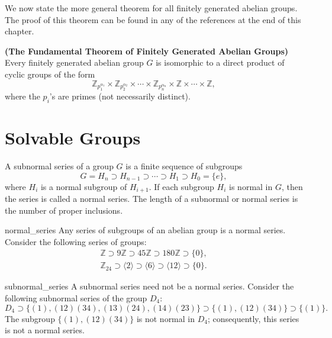  
We now state the more general theorem for all finitely generated
abelian groups.  The proof of this theorem can be found in any of the 
references at the end of this chapter.
 
 
\begin{theorem}
{\bf (The Fundamental Theorem of Finitely Generated Abelian Groups)}
Every finitely generated abelian group $G$ is isomorphic to a direct
product of cyclic groups of the form 
\[
{\mathbb Z}_{p_1^{ \alpha_1 }}
\times
{\mathbb Z}_{p_2^{ \alpha_2 }}
\times
\cdots
\times
{\mathbb Z}_{p_n^{ \alpha_n }}
\times
{\mathbb Z}
\times \cdots \times
{\mathbb Z},
\]
where the $p_i$'s are primes (not necessarily distinct).
\end{theorem}

 
\section{Solvable Groups}

A {\bfi subnormal series\/} 
of a group $G$ is a finite sequence of subgroups 
\[
G = H_n \supset H_{n-1} \supset \cdots \supset H_1 \supset
H_0 = \{ e \},
\]
where $H_i$ is a normal subgroup of $H_{i+1}$. If each subgroup $H_i$
is normal in $G$, then the series is called a {\bfi normal
series}. The {\bfi length\/} of a 
subnormal or normal series is the number of proper inclusions. 
 

\begin{example}{normal_series}
Any series of subgroups of an abelian group is a normal series.
Consider the following  series of groups: 
\begin{gather*}
{\mathbb Z} \supset 9{\mathbb Z} \supset 45{\mathbb Z} \supset 180{\mathbb Z} 
\supset \{0\}, \\
{\mathbb Z}_{24} \supset \langle 2 \rangle \supset \langle 6 \rangle 
\supset \langle 12 \rangle
\supset \{0\}.
\end{gather*}
\end{example}
 
 
\begin{example}{subnormal_series}
A subnormal series need not be a normal series.  Consider the
following subnormal series of the group $D_4$: 
\[
D_4 \supset \{ (1),
(12)(34), (13)(24), (14)(23) \} \supset  \{  (1), (12)(34) \} 
\supset \{ (1) \}.
\]
The subgroup $\{  (1), (12)(34) \}$ is not normal in $D_4$;
consequently, this series is not a normal series.
\end{example}

